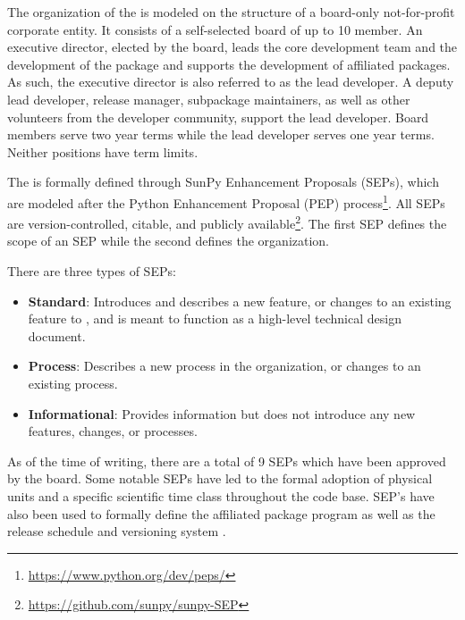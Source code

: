 The organization of the \sunpyproj is modeled on the structure of a board-only not-for-profit corporate entity.
It consists of a self-selected board of up to 10 member.
An executive director, elected by the board, leads the core development team and the development of the \sunpypkg  package and supports the development of affiliated packages.
As such, the executive director is also referred to as the lead developer.
A deputy lead developer, release manager, subpackage maintainers, as well as other volunteers from the developer community, support the lead developer.
Board members serve two year terms while the lead developer serves one year terms. Neither positions have term limits.

The \sunpyproj is formally defined through SunPy Enhancement Proposals (SEPs), which are modeled after the Python Enhancement Proposal (PEP) process\footnote{\url{https://www.python.org/dev/peps/}}.
All SEPs are version-controlled, citable, and publicly available\footnote{\url{https://github.com/sunpy/sunpy-SEP}}.
The first SEP \citep[SEP-0001][]{sep-0001} defines the scope of an SEP \citep[similar to][]{ape-0001} while the second \citep[SEP-0002][]{sep-0002} defines the  \sunpyproj organization.

There are three types of SEPs:
\begin{itemize}
    \item \textbf{Standard}: Introduces and describes a new feature, or changes to an existing feature to \sunpypkg, and is meant to function as a high-level technical design document.
    \item \textbf{Process}: Describes a new process in the organization, or changes to an existing process.
    \item \textbf{Informational}: Provides information but does not introduce any new features, changes, or processes.
\end{itemize}

As of the time of writing, there are a total of 9 SEPs which have been approved by the board.
Some notable SEPs have led to the formal adoption of physical units \citep[SEP-0003,][see \autoref{sec:units}]{sep-0003} and a specific scientific time class \citep[SEP-0008,][see \autoref{sec:units}]{sep-0008} throughout the code base.
SEP's have also been used to formally define the affiliated package program \citep[SEP-0004,][see \autoref{sec:affil_package}]{sep-0004} as well as the release schedule and versioning system \citep[SEP-0009,][see \autoref{sec:release}]{sep-0009}.
